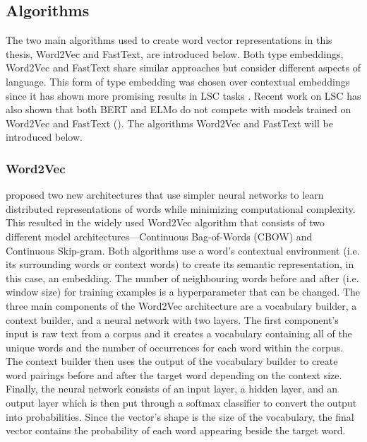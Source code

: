 \subsection{Algorithms}

The two main algorithms used to create word vector representations in this thesis, Word2Vec and FastText, are introduced below. Both type embeddings, Word2Vec and FastText share similar approaches but consider different aspects of language. This form of type embedding was chosen over contextual embeddings since it has shown more promising results in LSC tasks \citep{schlechtweg-etal-2020-semeval}. Recent work on LSC has also shown that both BERT and ELMo do not compete with models trained on Word2Vec and FastText (\citet{schlechtweg-etal-2020-semeval, kaiser-diacrita2020,laicher-2020, uiouva-kutuzovsemeval2020}). The algorithms Word2Vec and FastText will be introduced below. 


\subsubsection{Word2Vec}
\citet{mikolov2013efficient} proposed two new architectures that use simpler neural networks to learn distributed representations of words while minimizing computational complexity. This resulted in the widely used Word2Vec algorithm that consists of two different model architectures—Continuous Bag-of-Words (CBOW) and Continuous Skip-gram. Both algorithms use a word’s contextual environment (i.e. its surrounding words or context words) to create its semantic representation, in this case, an embedding. The number of neighbouring words before and after (i.e. window size) for training examples is a hyperparameter that can be changed. The three main components of the Word2Vec architecture are a vocabulary builder, a context builder, and a neural network with two layers. The first component’s input is raw text from a corpus and it creates a vocabulary containing all of the unique words and the number of occurrences for each word within the corpus. The context builder then uses the output of the vocabulary builder to create word pairings before and after the target word depending on the context size. Finally, the neural network consists of an input layer, a hidden layer, and an output layer which is then put through a softmax classifier to convert the output into probabilities. Since the vector’s shape is the size of the vocabulary, the final vector contains the probability of each word appearing beside the target word. 

